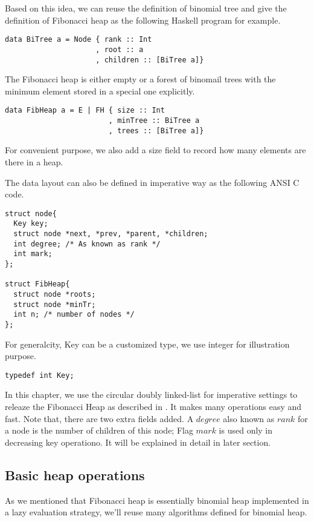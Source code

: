 \documentclass{article}
\begin{document}
Based on this idea, we can reuse the definition of binomial tree
and give the definition of Fibonacci heap as the following Haskell
program for example.

\lstset{language=Haskell}
\begin{lstlisting}
data BiTree a = Node { rank :: Int
                     , root :: a
                     , children :: [BiTree a]}
\end{lstlisting}

The Fibonacci heap is either empty or a forest of binomail trees with
the minimum element stored in a special one explicitly.

\begin{lstlisting}
data FibHeap a = E | FH { size :: Int
                        , minTree :: BiTree a
                        , trees :: [BiTree a]}
\end{lstlisting}

For convenient purpose, we also add a size field to record how many
elements are there in a heap.

The data layout can also be defined in imperative way as the following
ANSI C code.

\lstset{language=C}
\begin{lstlisting}
struct node{
  Key key;
  struct node *next, *prev, *parent, *children;
  int degree; /* As known as rank */
  int mark;
};

struct FibHeap{
  struct node *roots;
  struct node *minTr; 
  int n; /* number of nodes */
};
\end{lstlisting}

For generalcity, Key can be a customized type, we use integer for illustration
purpose.

\lstset{language=C}
\begin{lstlisting}
typedef int Key;
\end{lstlisting}

In this chapter, we use the circular doubly linked-list for imperative
settings to releaze the Fibonacci Heap as described in \cite{CLRS}.
It makes many operations easy and fast. Note that, there are two extra
fields added. A $degree$ also known as $rank$ for a node is the number
of children of this node; Flag $mark$ is used only in decreasing key
operationo. It will be explained in detail in later section.


\subsection{Basic heap operations}
As we mentioned that Fibonacci heap is essentially binomial heap 
implemented in a lazy evaluation strategy, we'll reuse many algorithms
defined for binomial heap.
\end{document}
